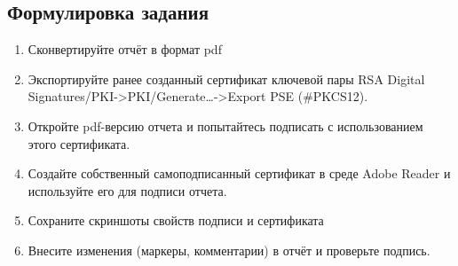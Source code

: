 \documentclass[a4paper, 14pt]{extarticle}
\begin{document}
\subsection{Формулировка задания}
\begin{enumerate}
    \item Сконвертируйте отчёт в формат pdf
    \item Экспортируйте ранее созданный сертификат ключевой пары RSA Digital Signatures/PKI->PKI/Generate…->Export PSE (\#PKCS12).
    \item Откройте pdf-версию отчета и попытайтесь подписать с использованием этого сертификата.
    \item Создайте собственный самоподписанный сертификат в среде Adobe Reader и используйте его для подписи отчета.
    \item Сохраните скриншоты свойств подписи и сертификата
    \item Внесите изменения (маркеры, комментарии) в отчёт и проверьте подпись.
\end{enumerate}
\end{document}
